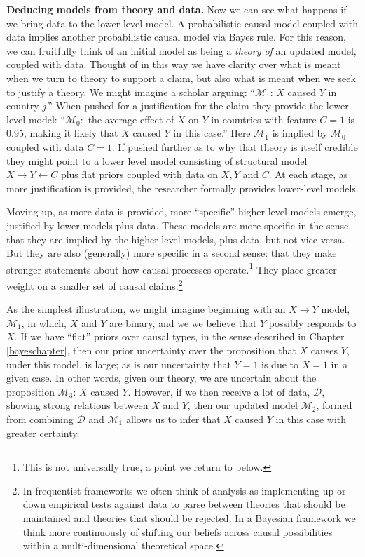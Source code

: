 \documentclass[
  12pt,
]{book}
\begin{document}
\textbf{Deducing models from theory and data.} Now we can see what happens if we bring data to the lower-level model. A probabilistic causal model coupled with data implies another probabilistic causal model via Bayes rule. For this reason, we can fruitfully think of an initial model as being a \emph{theory of} an updated model, coupled with data. Thought of in this way we have clarity over what is meant when we turn to theory to support a claim, but also what is meant when we seek to justify a theory. We might imagine a scholar arguing: ``\(\mathcal M_1\): \(X\) caused \(Y\) in country \(j\).'' When pushed for a justification for the claim they provide the lower level model: ``\(\mathcal M_0:\) the average effect of \(X\) on \(Y\) in countries with feature \(C=1\) is 0.95, making it likely that \(X\) caused \(Y\) in this case.'' Here \(\mathcal M_1\) is implied by \(\mathcal M_0\) coupled with data \(C=1\). If pushed further as to why that theory is itself credible they might point to a lower level model consisting of structural model \(X\rightarrow Y \leftarrow C\) plus flat priors coupled with data on \(X,Y\) and \(C\). At each stage, as more justification is provided, the researcher formally provides lower-level models.

Moving up, as more data is provided, more ``specific'' higher level models emerge, justified by lower models plus data. These models are more specific in the sense that they are implied by the higher level models, plus data, but not vice versa. But they are also (generally) more specific in a second sense: that they make stronger statements about how causal processes operate.\footnote{This is not universally true, a point we return to below.} They place greater weight on a smaller set of causal claims.\footnote{In frequentist frameworks we often think of analysis as implementing up-or-down empirical tests against data to parse between theories that should be maintained and theories that should be rejected. In a Bayesian framework we think more continuously of shifting our beliefs across causal possibilities within a multi-dimensional theoretical space.}

As the simplest illustration, we might imagine beginning with an \(X\rightarrow Y\) model, \(\mathcal M_1\), in which, \(X\) and \(Y\) are binary, and we we believe that \(Y\) possibly responds to \(X\). If we have ``flat'' priors over causal types, in the sense described in Chapter \ref{bayeschapter}, then our prior uncertainty over the proposition that \(X\) causes \(Y\), under this model, is large; as is our uncertainty that \(Y=1\) is due to \(X=1\) in a given case. In other words, given our theory, we are uncertain about the proposition \(\mathcal M_3\): \(X\) caused \(Y\). However, if we then receive a lot of data, \(\mathcal D\), showing strong relations between \(X\) and \(Y\), then our updated model \(\mathcal M_2\), formed from combining \(\mathcal D\) and \(\mathcal M_1\) allows us to infer that \(X\) caused \(Y\) in this case with greater certainty.
\end{document}
